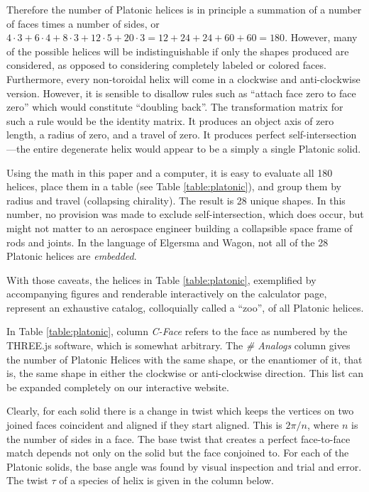 \documentclass{svproc}
\begin{document}
Therefore the number of Platonic helices is in principle a summation of a number of faces times a number of sides, or
$4 \cdot 3 + 6 \cdot 4 + 8 \cdot 3 + 12 \cdot 5 + 20 \cdot 3 = 12 + 24 + 24 + 60 + 60 = 180$.
However, many of the possible helices will be indistinguishable if only the shapes produced are considered,
as opposed to considering completely labeled or colored faces.
Furthermore, every non-toroidal helix will come in a clockwise and anti-clockwise version.
However, it is sensible to disallow rules such as ``attach face zero to face zero''
which would constitute
``doubling back''\cite{elgersma2016quadrahelix}.
The transformation matrix for such a rule would be the identity matrix.
It produces an object axis of zero length, a radius of zero, and
a travel of zero. It produces perfect self-intersection---the entire
degenerate helix would appear to be a simply a single Platonic solid.

Using the math in this paper and a computer, it is easy to evaluate all 180 helices,
place them in a table (see Table \ref{table:platonic}), and group them
by radius and travel (collapsing chirality).
The result is 28 unique shapes. In this number, no provision was made to exclude
self-intersection,
which does occur, but might not matter to
an aerospace engineer building a collapsible space frame of rods and joints.
In the language of Elgersma and Wagon\cite{elgersma2016quadrahelix}, not
all of the 28 Platonic helices are {\em embedded}.

With those caveats, the helices in Table \ref{table:platonic}, exemplified by
accompanying figures and renderable
interactively on the calculator page, represent an exhaustive catalog,
colloquially called a ``zoo'', of all Platonic helices.

In Table \ref{table:platonic}, column {\em C-Face} refers to the
face as numbered by the THREE.js software\cite{dirksen2013learning},
which is somewhat arbitrary. The {\em \# Analogs}
column gives the number of Platonic Helices with the same shape, or the enantiomer of it,
that is, the same
shape in either the clockwise or anti-clockwise direction.
This list can be expanded completely on our interactive website.

Clearly, for each solid there is a change in twist which keeps the vertices on
two joined faces coincident and
aligned if they start aligned. This is $2\pi/n$,
where $n$ is the number of sides in a face. The base twist that creates
a perfect face-to-face match depends not only on the solid but the face conjoined to.
For each of the Platonic
solids, the base angle was found by visual inspection and trial and error.
The twist $\tau$ of a species
of helix is given in the column below.
\end{document}
